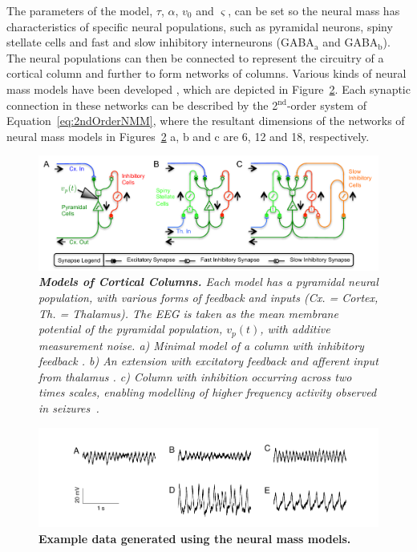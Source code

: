 \documentclass{article}
\begin{document}
The parameters of the model, $\tau$, $\alpha$, $v_0$ and $\varsigma$, can be set so the neural mass has characteristics of specific neural populations, such as pyramidal neurons, spiny stellate cells and fast and slow inhibitory interneurons (GABA$_\mathrm{a}$ and GABA$_\mathrm{b}$). The neural populations can then be connected to represent the circuitry of a cortical column and further to form networks of columns. Various kinds of neural mass models have been developed \cite{Silva1974,Jansen1995,Wendling2002,David2003}, which are depicted in Figure~\ref{fig:NMMs}. Each synaptic connection in these networks can be described by the 2$^{\mathrm{nd}}$-order system of Equation~\ref{eq:2ndOrderNMM}, where the resultant dimensions of the networks of neural mass models in Figures~\ref{fig:NMMs} a, b and c are 6, 12 and 18, respectively.
\begin{figure}[ht]
	\centering
		\includegraphics[scale=1]{./figures/pdf/NeuralMassesHoriz_plos.pdf}
	\caption{\emph{\textbf{Models of Cortical Columns.} Each model has a pyramidal neural population, with various forms of feedback and inputs (Cx. = Cortex, Th. = Thalamus). The EEG is taken as the mean membrane potential of the pyramidal population, $v_p(t)$, with additive measurement noise.  a) Minimal model of a column with inhibitory feedback \cite{Silva1974}. b) An extension with excitatory feedback and afferent input from thalamus \cite{Jansen1995,David2003}. c) Column with inhibition occurring across two times scales, enabling modelling of higher frequency activity observed in seizures~\cite{Wendling2002}.}}
	\label{fig:NMMs}
\end{figure}

\begin{figure}[ht]
	\centering
		\includegraphics[scale=1]{./figures/pdf/Example_Data.pdf}
		\caption{\textbf{Example data generated using the neural mass models.}}
	\label{fig:NMMs}
\end{figure}
\end{document}
